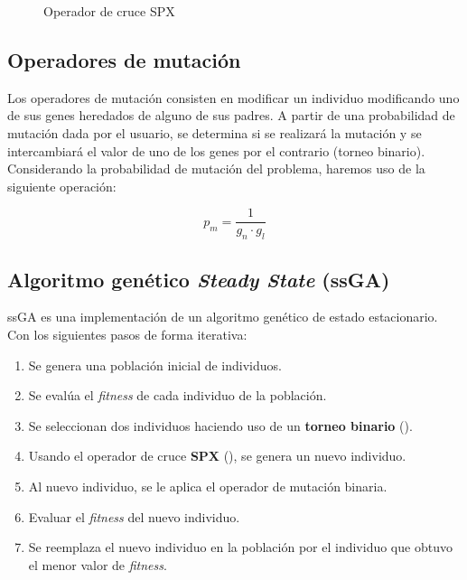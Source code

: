\documentclass[runningheads]{llncs}
\begin{document}
\begin{figure}
	\caption{Operador de cruce SPX}
	\label{fig:crossover}
\end{figure}

\subsection{Operadores de mutación}
Los operadores de mutación consisten en modificar un individuo modificando uno de sus genes heredados de alguno de sus padres.
A partir de una probabilidad de mutación dada por el usuario, se determina si se realizará la mutación y se intercambiará el valor de uno de los genes
por el contrario (torneo binario).\\
Considerando la probabilidad de mutación del problema, haremos uso de la siguiente operación:

\begin{equation}
	p_m = \frac{1}{g_n \cdot g_l}
\end{equation}


\subsection{Algoritmo genético \textit{Steady State} (ssGA)}
ssGA es una implementación de un algoritmo genético de estado estacionario. Con los siguientes pasos de forma iterativa:

\begin{enumerate}
	\item Se genera una población inicial de individuos.
	\item Se evalúa el \textit{fitness} de cada individuo de la población.
	\item Se seleccionan dos individuos haciendo uso de un \textbf{torneo binario} (\cite{ref_tournament}).
	\item Usando el operador de cruce \textbf{SPX} (\cite{ref_spx}), se genera un nuevo individuo.
	\item Al nuevo individuo, se le aplica el operador de mutación binaria.
	\item Evaluar el \textit{fitness} del nuevo individuo.
	\item Se reemplaza el nuevo individuo en la población por el individuo que obtuvo el menor valor de \textit{fitness}.
\end{enumerate}
\end{document}
